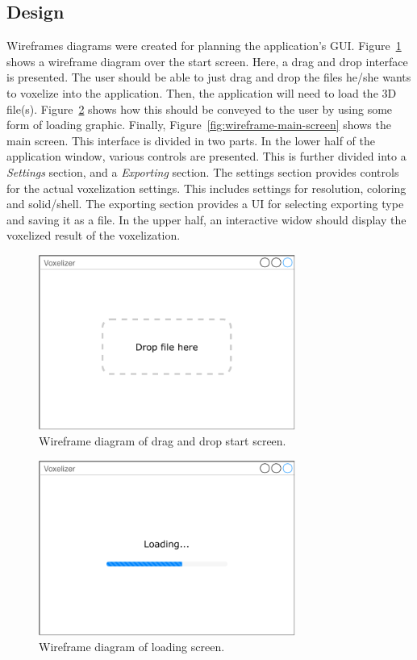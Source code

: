 \subsection{Design}
Wireframes diagrams were created for planning the application's GUI. Figure~\ref{fig:wireframe-dnd} shows a wireframe diagram over the start screen. Here, a drag and drop interface is presented. The user should be able to just drag and drop the files he/she wants to voxelize into the application. Then, the application will need to load the 3D file(s). Figure~\ref{fig:wireframe-loading} shows how this should be conveyed to the user by using some form of loading graphic. Finally, Figure~\ref{fig:wireframe-main-screen} shows the main screen. This interface is divided in two parts. In the lower half of the application window, various controls are presented. This is further divided into a \textit{Settings} section, and a \textit{Exporting} section. The settings section provides controls for the actual voxelization settings. This includes settings for resolution, coloring and solid/shell. The exporting section provides a UI for selecting exporting type and saving it as a file. In the upper half, an interactive widow should display the voxelized result of the voxelization.
\begin{figure}[htp]
    \centering
    \includegraphics[width=0.75\textwidth]{sections/methodology/figures/wireframes/wireframe-dnd.pdf}
    \caption{Wireframe diagram of drag and drop start screen.}
    \label{fig:wireframe-dnd}
\end{figure}
\begin{figure}[htp]
    \centering
    \includegraphics[width=0.75\textwidth]{sections/methodology/figures/wireframes/wireframe-loading.pdf}
    \caption{Wireframe diagram of loading screen.}
    \label{fig:wireframe-loading}
\end{figure}
